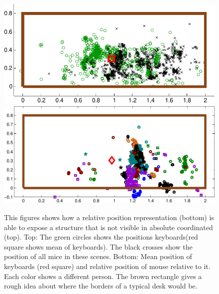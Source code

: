 \documentclass[letterpaper, 10 pt, conference]{ieeeconf}  %
\begin{document}
\begin{figure}
\begin{center}
\includegraphics[width=0.8\linewidth]{keyboard_mouse_raw-crop}
\includegraphics[width=0.8\linewidth]{clusters/plots-for-paper/keyboard_mouse_clusters-crop}
\end{center}
\caption{This figures shows how a relative position representation (bottom) is able to expose a structure that is not visible in absolute coordinated (top). 
Top: The green circles shows the positions keyboards(red square shows mean of keyboards). The black crosses show the position of all mice in these scenes. Bottom: Mean position of keyboards (red square) and relative position of mouse relative to it. Each color shows a different person. The brown rectangle gives a rough idea about where the borders of a typical desk would be.} 
\label{fig:scatter-keyboard-mouse}
\end{figure}
\end{document}
